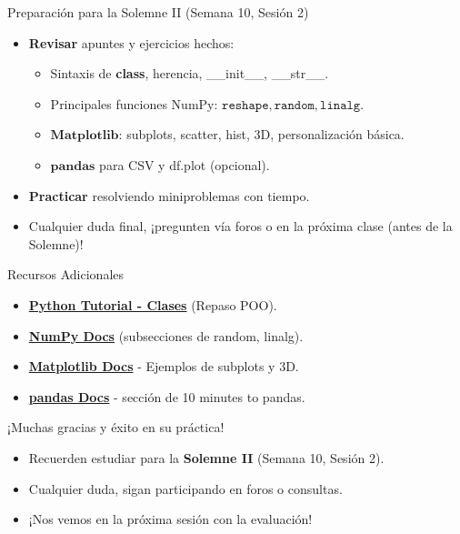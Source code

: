 \documentclass[10pt]{beamer}
\begin{document}
\begin{frame}{Preparación para la Solemne II (Semana 10, Sesión 2)}
  \begin{itemize}
    \item \textbf{Revisar} apuntes y ejercicios hechos:
      \begin{itemize}
        \item Sintaxis de \textbf{class}, herencia, \_\_init\_\_, \_\_str\_\_.
        \item Principales funciones NumPy: \(\texttt{reshape}, \texttt{random}, \texttt{linalg}\).
        \item \(\textbf{Matplotlib}\): subplots, scatter, hist, 3D, personalización básica.
        \item \(\textbf{pandas}\) para CSV y df.plot (opcional).
      \end{itemize}
    \item \textbf{Practicar} resolviendo miniproblemas con tiempo.
    \item Cualquier duda final, ¡pregunten vía foros o en la próxima clase (antes de la Solemne)! 
  \end{itemize}
\end{frame}

\begin{frame}{Recursos Adicionales}
  \begin{itemize}
    \item \href{https://docs.python.org/3/tutorial/classes.html}{\textbf{Python Tutorial - Clases}} (Repaso POO).
    \item \href{https://numpy.org/doc/}{\textbf{NumPy Docs}} (subsecciones de random, linalg).
    \item \href{https://matplotlib.org/stable/}{\textbf{Matplotlib Docs}} - Ejemplos de subplots y 3D.
    \item \href{https://pandas.pydata.org/}{\textbf{pandas Docs}} - sección de 10 minutes to pandas.
  \end{itemize}
\end{frame}

\begin{frame}
  \Huge{\centerline{¡Muchas gracias y éxito en su práctica!}}
  \vspace{0.3cm}
  \normalsize
  \begin{itemize}
    \item Recuerden estudiar para la \textbf{Solemne II} (Semana 10, Sesión 2).
    \item Cualquier duda, sigan participando en foros o consultas.
    \item ¡Nos vemos en la próxima sesión con la evaluación!
  \end{itemize}
\end{frame}
\end{document}
